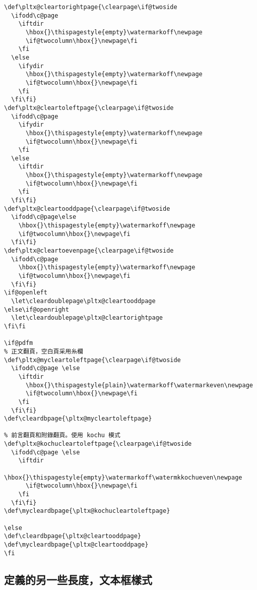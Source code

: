 \begin{lstlisting}[firstnumber=331]
\def\pltx@cleartorightpage{\clearpage\if@twoside
  \ifodd\c@page
    \iftdir
      \hbox{}\thispagestyle{empty}\watermarkoff\newpage
      \if@twocolumn\hbox{}\newpage\fi
    \fi
  \else
    \ifydir
      \hbox{}\thispagestyle{empty}\watermarkoff\newpage
      \if@twocolumn\hbox{}\newpage\fi
    \fi
  \fi\fi}
\def\pltx@cleartoleftpage{\clearpage\if@twoside
  \ifodd\c@page
    \ifydir
      \hbox{}\thispagestyle{empty}\watermarkoff\newpage
      \if@twocolumn\hbox{}\newpage\fi
    \fi
  \else
    \iftdir
      \hbox{}\thispagestyle{empty}\watermarkoff\newpage
      \if@twocolumn\hbox{}\newpage\fi
    \fi
  \fi\fi}
\def\pltx@cleartooddpage{\clearpage\if@twoside
  \ifodd\c@page\else
    \hbox{}\thispagestyle{empty}\watermarkoff\newpage
    \if@twocolumn\hbox{}\newpage\fi
  \fi\fi}
\def\pltx@cleartoevenpage{\clearpage\if@twoside
  \ifodd\c@page
    \hbox{}\thispagestyle{empty}\watermarkoff\newpage
    \if@twocolumn\hbox{}\newpage\fi
  \fi\fi}
\if@openleft
  \let\cleardoublepage\pltx@cleartooddpage
\else\if@openright
  \let\cleardoublepage\pltx@cleartorightpage
\fi\fi

\if@pdfm
% 正文翻頁，空白頁采用糸欄
\def\pltx@mycleartoleftpage{\clearpage\if@twoside
  \ifodd\c@page \else
    \iftdir
      \hbox{}\thispagestyle{plain}\watermarkoff\watermarkeven\newpage
      \if@twocolumn\hbox{}\newpage\fi
    \fi
  \fi\fi}
\def\cleardbpage{\pltx@mycleartoleftpage}

% 前言翻頁和附錄翻頁。使用 kochu 模式
\def\pltx@kochucleartoleftpage{\clearpage\if@twoside
  \ifodd\c@page \else
    \iftdir
      \hbox{}\thispagestyle{empty}\watermarkoff\watermkkochueven\newpage
      \if@twocolumn\hbox{}\newpage\fi
    \fi
  \fi\fi}
\def\mycleardbpage{\pltx@kochucleartoleftpage}

\else
\def\cleardbpage{\pltx@cleartooddpage}
\def\mycleardbpage{\pltx@cleartooddpage}
\fi
\end{lstlisting}

\subsection{定義的另一些長度，文本框樣式}

